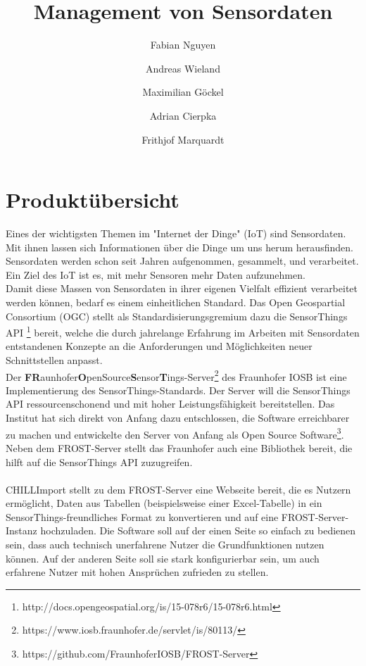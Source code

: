 \documentclass[a4paper, 12 pt]{article}
\author{Fabian Nguyen \and Andreas Wieland \and Maximilian Göckel \and Adrian Cierpka \and Frithjof Marquardt}
\title{Management von Sensordaten}
\begin{document}
\maketitle
\newpage
\tableofcontents
\newpage

	\section{Produktübersicht}

	Eines der wichtigsten Themen im "{Internet der Dinge}" (IoT) sind Sensordaten. Mit ihnen lassen sich Informationen über die Dinge um uns herum herausfinden. Sensordaten werden schon seit Jahren aufgenommen, gesammelt, und verarbeitet. Ein Ziel des IoT ist es, mit mehr Sensoren mehr Daten aufzunehmen. \\

	Damit diese Massen von Sensordaten in ihrer eigenen Vielfalt effizient verarbeitet werden können, bedarf es einem einheitlichen Standard. Das Open Geospartial Consortium (OGC) stellt als Standardisierungsgremium dazu die SensorThings API \footnote{http://docs.opengeospatial.org/is/15-078r6/15-078r6.html} bereit, welche die durch jahrelange Erfahrung im Arbeiten mit Sensordaten entstandenen Konzepte an die Anforderungen und Möglichkeiten neuer Schnittstellen anpasst. \\

	Der \textbf{FR}aunhofer\textbf{O}penSource\textbf{S}ensor\textbf{T}ings-Server\footnote{https://www.iosb.fraunhofer.de/servlet/is/80113/} des Fraunhofer IOSB ist eine Implementierung des SensorThings-Standards. Der Server will die SensorThings API ressourcenschonend und mit hoher Leistungsfähigkeit bereitstellen. Das Institut hat sich direkt von Anfang dazu entschlossen, die Software erreichbarer zu machen und entwickelte den Server von Anfang als Open Source Software\footnote{https://github.com/FraunhoferIOSB/FROST-Server}. \\

	Neben dem FROST-Server stellt das Fraunhofer auch eine Bibliothek bereit, die hilft auf die SensorThings API zuzugreifen. \\
	\ \\
	CHILLImport stellt zu dem FROST-Server eine Webseite bereit, die es Nutzern ermöglicht, Daten aus Tabellen (beispielsweise einer Excel-Tabelle) in ein SensorThings-freundliches Format zu konvertieren und auf eine FROST-Server-Instanz hochzuladen. Die Software soll auf der einen Seite so einfach zu bedienen sein, dass auch technisch unerfahrene Nutzer die Grundfunktionen nutzen können. Auf der anderen Seite soll sie stark konfigurierbar sein, um auch erfahrene Nutzer mit hohen Ansprüchen zufrieden zu stellen.\\
\end{document}
